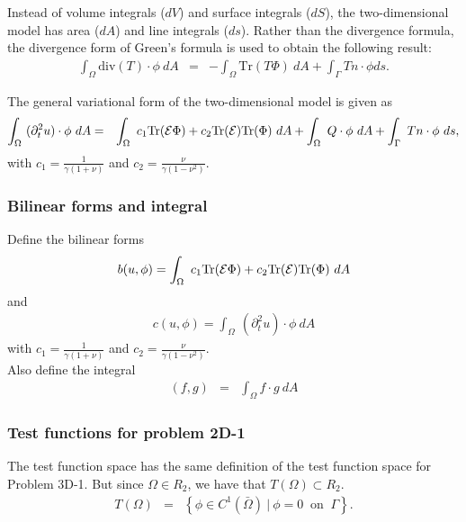 \documentclass[../../main.tex]{subfiles}
\begin{document}
Instead of volume integrals ($dV$) and surface integrals ($dS$), the two-dimensional model has area ($dA$) and line integrals ($ds$). Rather than the divergence formula, the divergence form of Green's formula is used to obtain the following result:\label{sym:dV}\label{sym:dS}\label{sym:dA}\label{sym:ds}
\begin{eqnarray*}
	\int_{\Omega} \textrm{div}(T)\cdot \phi \ dA & = & -\int_{\Omega} \textrm{Tr}(T\Phi) \ dA + \int_{\Gamma} Tn\cdot \phi ds.
\end{eqnarray*}

The general variational form of the two-dimensional model is given as
\begin{eqnarray*}
	\int_\Omega~ (\partial^2_t u) \cdot \phi~dA & = & \int_\Omega~c_1\textrm{Tr}({\cal E}\Phi)+ c_2\textrm{Tr}({\cal E})
	\textrm{Tr}(\Phi) ~dA + \int_\Omega~ Q \cdot \phi~dA
	+ \int_\Gamma~Tn \cdot \phi~ds,
\end{eqnarray*}
with $\displaystyle c_1 = \frac{1}{\gamma(1+\nu)}$ and $\displaystyle c_2 = \frac{\nu}{\gamma(1-\nu^2)}$.

\subsubsection{Bilinear forms and integral}\label{sssec:2D_Model:BilinearForm}
Define the bilinear forms
\begin{eqnarray}
	b(u,\phi) = \int_\Omega~c_1\textrm{Tr}({\cal E}\Phi)+ c_2\textrm{Tr}({\cal E})
	\textrm{Tr}(\Phi) ~dA \label{eq:2D_Model:Bilinear}
\end{eqnarray}
and
\begin{eqnarray}
	c(u,\phi) = \int_\Omega~ (\partial^2_t u) \cdot \phi~dA \label{eq:2D_Model:Bilinear_c}
\end{eqnarray}
with $\displaystyle c_1 = \frac{1}{\gamma(1+\nu)}$ and $\displaystyle c_2 = \frac{\nu}{\gamma(1-\nu^2)}$.\\
Also define the integral
\begin{eqnarray}
	(f,g) &=& \int_{\Omega} f\cdot g \ dA \label{eq:2D_Model:Bilinear_int}
\end{eqnarray}

\subsubsection{Test functions for problem 2D-1}\label{sssec:2D_Model:TestFunctions2D1}
The test function space has the same definition of the test function space for Problem 3D-1. But since $\Omega \in R_2$, we have that $T(\Omega) \subset R_2$.
\begin{eqnarray*}
	T(\Omega) & = & \left\{ \phi \in C^1(\bar{\Omega}) \ | \ \phi = 0 \ \textrm{ on } \ \Gamma \right\}.
\end{eqnarray*}
\end{document}
